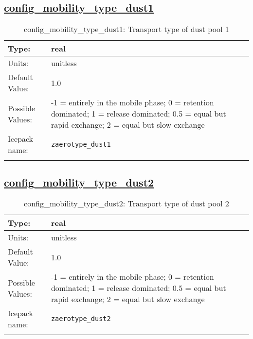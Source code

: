 \subsection[config\_mobility\_type\_dust1]{\hyperref[sec:nm_tab_biogeochemistry]{config\_mobility\_type\_dust1}}
\label{subsec:nm_sec_config_mobility_type_dust1}
\begin{center}
\begin{longtable}{| p{2.0in} || p{4.0in} |}
    \hline
    Type: & real \\
    \hline
    Units: & \si{unitless} \\
    \hline
    Default Value: & 1.0 \\
    \hline
    Possible Values: & -1 = entirely in the mobile phase; 0 = retention dominated; 1 = release dominated; 0.5 = equal but rapid exchange; 2 = equal but slow exchange \\
    \hline
    \hline
    Icepack name: & \verb+zaerotype_dust1+ \\
    \caption{config\_mobility\_type\_dust1: Transport type of dust pool 1}
\end{longtable}
\end{center}
\subsection[config\_mobility\_type\_dust2]{\hyperref[sec:nm_tab_biogeochemistry]{config\_mobility\_type\_dust2}}
\label{subsec:nm_sec_config_mobility_type_dust2}
\begin{center}
\begin{longtable}{| p{2.0in} || p{4.0in} |}
    \hline
    Type: & real \\
    \hline
    Units: & \si{unitless} \\
    \hline
    Default Value: & 1.0 \\
    \hline
    Possible Values: & -1 = entirely in the mobile phase; 0 = retention dominated; 1 = release dominated; 0.5 = equal but rapid exchange; 2 = equal but slow exchange \\
    \hline
    \hline
    Icepack name: & \verb+zaerotype_dust2+ \\
    \caption{config\_mobility\_type\_dust2: Transport type of dust pool 2}
\end{longtable}
\end{center}
